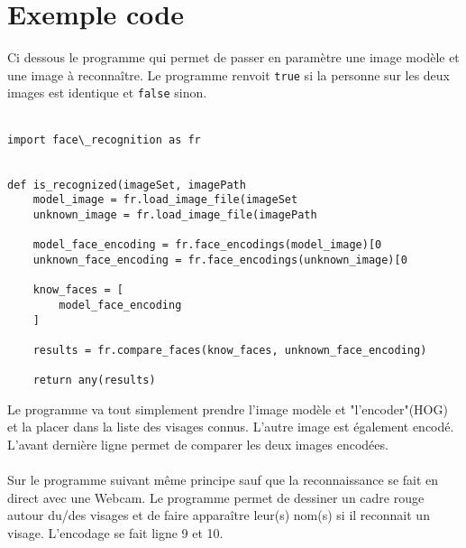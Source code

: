 \section{Exemple code}
Ci dessous le programme qui permet de passer en paramètre une image modèle et
une image à reconnaître. Le programme renvoit \verb|true| si la personne sur les deux
images est identique et \verb|false| sinon.
\\
\\
  \begin{verbatim}
import face\_recognition as fr


def is_recognized(imageSet, imagePath
    model_image = fr.load_image_file(imageSet
    unknown_image = fr.load_image_file(imagePath

    model_face_encoding = fr.face_encodings(model_image)[0
    unknown_face_encoding = fr.face_encodings(unknown_image)[0

    know_faces = [
        model_face_encoding
    ]

    results = fr.compare_faces(know_faces, unknown_face_encoding)

    return any(results)
  \end{verbatim}
Le programme va tout simplement prendre l'image modèle et "l'encoder"(HOG) et
la placer dans la liste des visages connus. L'autre image est également
encodé. L'avant dernière ligne permet de comparer les deux images encodées.
\\
\\
Sur le programme suivant même principe sauf que la reconnaissance se fait en direct
avec une Webcam. Le programme permet de dessiner un cadre rouge autour du/des
visages et de faire apparaître leur(s) nom(s) si il reconnait un visage.
L'encodage se fait ligne 9 et 10.\\
\\
\newpage

